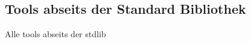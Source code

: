\subsection{Tools abseits der Standard Bibliothek}\label{python-tools:extlib}
Alle tools abseits der stdlib




